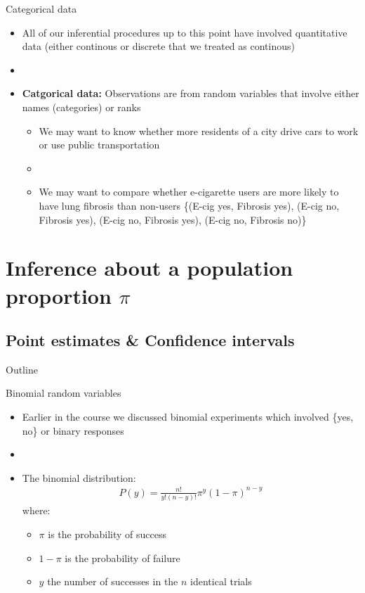 \documentclass[xcolor=dvipsnames]{beamer}
\begin{document}
\begin{frame}{Categorical data}
	\begin{itemize}
		\item All of our inferential procedures up to this point have involved quantitative data (either continous or discrete that we treated as continous)
		\item[]
		\item \textbf{Catgorical data:} Observations are from random variables that involve either names (categories) or ranks
		\begin{itemize}
			\item We may want to know whether more residents of a city drive cars to work or use public transportation 
			\item[]
			\item We may want to compare whether e-cigarette users are more likely to have lung fibrosis than non-users \{(E-cig yes, Fibrosis yes), (E-cig no, Fibrosis yes), (E-cig no, Fibrosis yes), (E-cig no, Fibrosis no)\}
		\end{itemize}
	\end{itemize}
\end{frame}

\section{Inference about a population proportion $\pi$}
\subsection{Point estimates \& Confidence intervals}

\begin{frame}{Outline}
	\tableofcontents[currentsection,subsectionstyle=show/shaded/hide]
\end{frame}

\begin{frame}{Binomial random variables}
	\begin{itemize}
		\item Earlier in the course we discussed binomial experiments which involved \{yes, no\} or binary responses
		\item[]
		\item The binomial distribution:
		\begin{gather*}
		P(y) = \frac{n!}{y! (n - y)!} \pi^y (1-\pi)^{n-y}
		\end{gather*}
		where:
		\begin{itemize}
			\item $\pi$ is the probability of success
			\item $1-\pi$ is the probability of failure
			\item $y$ the number of successes in the $n$ identical trials
		\end{itemize}
	\end{itemize}
\end{frame}
\end{document}
